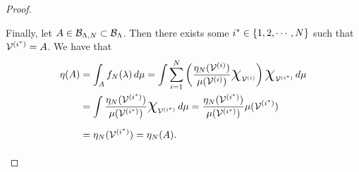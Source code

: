 \begin{proof}
\begin{itemize}
\noindent Finally, let $A\in\mathcal{B}_{{\Lambda}, N}\subset \mathcal{B}_{\Lambda}$.
Then there exists some $i^* \in \left\{1,2, \cdots, N\right\}$ such that $\mathcal{V}^{(i^*)} = A$.
We have that
\begin{equation*}
\begin{split}
\eta (A) &= \int_A f_\nsamps (\param) \, d\mu
=  \int \sum_{\iparam=1}^{\nsamps} \left ( \frac{\eta_\nsamps (\VV^{(\iparam)}) }{\mu (\VV^{(\iparam)})} \Chi_{\VV^{(\iparam)}}\right ) \Chi_{\VV^{(\iparam^*)}} \, d\mu \\
&= \int \frac{\eta_\nsamps (\VV^{(\iparam^*)}) }{\mu (\VV^{(\iparam^*)})} \Chi_{\VV^{(\iparam^*)}} \, d\mu
= \frac{\eta_\nsamps (\VV^{(\iparam^*)}) }{\mu (\VV^{(\iparam^*)})} \mu (\VV^{(\iparam^*)}) \\
&= \eta_\nsamps (\VV^{(\iparam^*)}) = \eta_\nsamps (A).
\end{split}
\end{equation*}

\end{itemize}
\end{proof}
